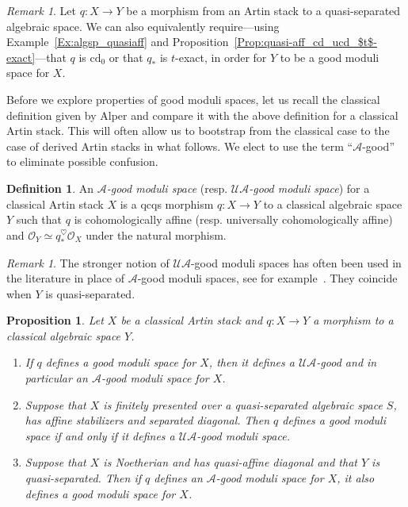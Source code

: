 \documentclass[a4paper,twoside,11pt]{amsart}
\theoremstyle{plain}
\newtheorem{proposition}[theorem]{Proposition}
\theoremstyle{definition}
\newtheorem{definition}[theorem]{Definition}
\theoremstyle{remark}
\newtheorem{remark}[theorem]{Remark}
\numberwithin{equation}{section}
\newcommand{\cd}{\mathrm{cd}}
\newcommand\sA{\mathcal{A}}
\renewcommand{\cd}{$\mathrm{cd}_{0}$\xspace}
\newcommand{\oO}{\mathcal{O}}
\begin{document}
\begin{remark}
    Let $q : X \to Y$ be a morphism from an Artin stack to a quasi-separated algebraic space.
    We can also equivalently require---using Example~\ref{Ex:algsp_quasiaff} and Proposition~\ref{Prop:quasi-aff_cd_ucd_$t$-exact}---that $q$ is \cd or that $q_*$ is $t$-exact, in order for $Y$ to be a good moduli space for $X$.
\end{remark}

Before we explore properties of good moduli spaces, let us recall the classical definition given by Alper \cite{AlperGood} and compare it with the above definition for a classical Artin stack. This will 
 often allow us to bootstrap from the classical case to the case of derived Artin stacks in what follows. We elect to use the term ``$\sA$-good'' to eliminate possible confusion.
 
\begin{definition}
    An \emph{$\sA$-good moduli space} (resp. \emph{$\mathcal{U}\sA$-good moduli space}) for a classical Artin stack $X$ is a qcqs morphism $q \colon X \to Y$ to a classical algebraic space $Y$ such that $q$ is cohomologically affine (resp. universally cohomologically affine) and $\oO_Y \simeq q_*^{\heartsuit} \oO_X$ under the natural morphism. 
\end{definition}

\begin{remark}
    The stronger notion of $\mathcal{U}\sA$-good moduli spaces has often been used in the literature in place of $\sA$-good moduli spaces, see for example~\cite{AHR2,FerrandPush}. They coincide when $Y$ is quasi-separated.
\end{remark}

\begin{proposition} \label{Prop:comparison between Alper and derived GMS}
    Let $X$ be a classical Artin stack and $q \colon X \to Y$ a morphism to a classical algebraic space $Y$. 
    \begin{enumerate}
        \item If $q$ defines a good moduli space for $X$, then it defines a $\mathcal{U}\sA$-good and in particular an $\sA$-good moduli space for $X$.
        \item Suppose that $X$ is finitely presented over a quasi-separated algebraic space $S$, has affine stabilizers and separated diagonal. Then $q$ defines a good moduli space if and only if it defines a $\mathcal{U}\sA$-good moduli space.
        \item Suppose that $X$ is Noetherian and has quasi-affine diagonal and that $Y$ is quasi-separated. Then if $q$ defines an $\sA$-good moduli space for $X$, it also defines a good moduli space for $X$.
    \end{enumerate}
\end{proposition}
\end{document}
